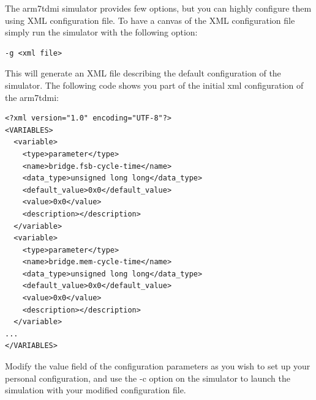 The arm7tdmi simulator provides few options, but you can highly configure them using XML configuration file. To have a canvas of the XML configuration file simply run the simulator with the following option:
\begin{verbatim}
-g <xml file>
\end{verbatim}

This will generate an XML file describing the default configuration of the simulator. The following code shows you part of the initial xml configuration of the arm7tdmi:
\begin{verbatim}
<?xml version="1.0" encoding="UTF-8"?>
<VARIABLES>
  <variable>
    <type>parameter</type>
    <name>bridge.fsb-cycle-time</name>
    <data_type>unsigned long long</data_type>
    <default_value>0x0</default_value>
    <value>0x0</value>
    <description></description>
  </variable>
  <variable>
    <type>parameter</type>
    <name>bridge.mem-cycle-time</name>
    <data_type>unsigned long long</data_type>
    <default_value>0x0</default_value>
    <value>0x0</value>
    <description></description>
  </variable>
...
</VARIABLES>
\end{verbatim}

Modify the value field of the configuration parameters as you wish to set up your personal configuration, and use the -c option on the simulator to launch the simulation with your modified configuration file.
